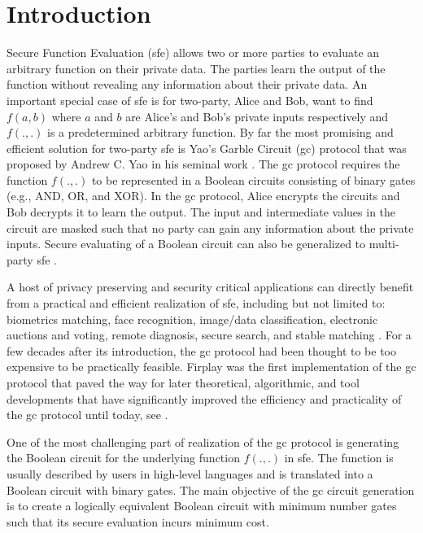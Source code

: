 \chapter{Introduction}
Secure Function Evaluation (\acrshort{sfe}) allows two or more parties to evaluate an arbitrary function on their private data.
The parties learn the output of the function without revealing any information about their private data.
An important special case of \acrshort{sfe} is for two-party, Alice and Bob, want to find $f(a, b)$ where $a$ and $b$ are Alice's and Bob's private inputs respectively and $f(., .)$ is a predetermined arbitrary function.
By far the most promising and efficient solution for two-party \acrshort{sfe} is Yao's Garble Circuit (\acrshort{gc}) protocol that was proposed by Andrew C. Yao in his seminal work \cite{yao1986generate}.
The \acrshort{gc} protocol requires the function $f(., .)$ to be represented in a Boolean circuits consisting of binary gates (e.g., AND, OR, and XOR).
In the \acrshort{gc} protocol, Alice encrypts the circuits and Bob decrypts it to learn the output.
The input and intermediate values in the circuit are masked such that no party can gain any information about the private inputs.
Secure evaluating of a Boolean circuit can also be generalized to multi-party \acrshort{sfe} \cite{goldreich1987play, ben2008fairplaymp}.

A host of privacy preserving and security critical applications can directly benefit from a practical and efficient realization of \acrshort{sfe}, including but not limited to: biometrics matching, face recognition, image/data classification, electronic auctions and voting, remote diagnosis, secure search, and stable matching \cite{riazi2017toward, zhang2016robust, bringer2013privacy, evans2011efficient, barni2009secure, naor1999privacy, brickell2007privacy, jha2008towards}.
For a few decades after its introduction, the \acrshort{gc} protocol had been thought to be too expensive to be practically feasible.
Firplay \cite{malkhi2004fairplay} was the first implementation of the \acrshort{gc} protocol that paved the way for later theoretical, algorithmic, and tool developments that have significantly improved the efficiency and practicality of the \acrshort{gc} protocol until today, see \cite{malkhi2004fairplay, kolesnikov2008improved, pinkas2009secure, huang2011faster, bellare2013efficient, zahur2015two, zahur2015obliv, liu2015oblivm}.

One of the most challenging part of realization of the \acrshort{gc} protocol is generating the Boolean circuit for the underlying function $f(., .)$ in \acrshort{sfe}.
The function is usually described by users in high-level languages and is translated into a Boolean circuit with binary gates.
The main objective of the \acrshort{gc} circuit generation is to create a logically equivalent Boolean circuit with minimum number gates such that its secure evaluation incurs minimum cost.

